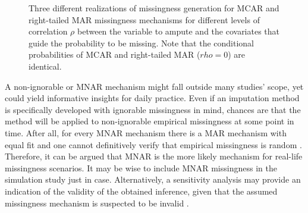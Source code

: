 \documentclass[bimj,fleqn]{w-art}
\begin{document}
\begin{figure}[h]
  \caption{Three different realizations of missingness generation for MCAR and right-tailed MAR missingness mechanisms for different levels of correlation $\rho$ between the variable to ampute and the covariates that guide the probability to be missing. Note that the conditional probabilities of MCAR and right-tailed MAR ($rho=0$) are identical.}
    \label{Fig4}
\end{figure}

A non-ignorable or MNAR mechanism might fall outside many studies' scope, yet could yield informative insights for daily practice. Even if an imputation method is specifically developed with ignorable missingness in mind, chances are that the method will be applied to non-ignorable empirical missingness at some point in time. After all, for every MNAR mechanism there is a MAR mechanism with equal fit and one cannot definitively verify that empirical missingness is random \citep{molenberghs2008every}. Therefore, it can be argued that MNAR is the more likely mechanism for real-life missingness scenarios. It may be wise to include MNAR missingness in the simulation study just in case. Alternatively, a sensitivity analysis may provide an indication of the validity of the obtained inference, given that the assumed missingness mechanism is suspected to be invalid \citep[see e.g.][part 5]{molenberghs2014handbook}.




 

% 
\end{document}
